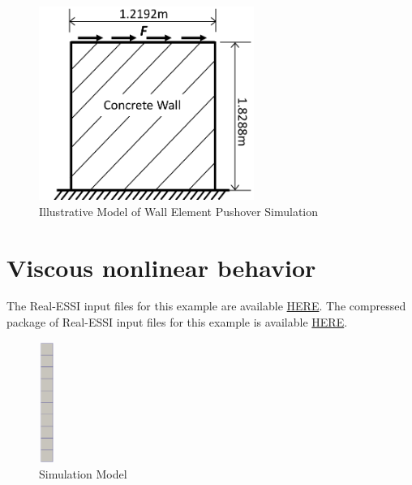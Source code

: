 \begin{figure}[H]
  \centering
  \includegraphics[width = 7cm]{./Figure-files/Day3/Wall_Pushover/overview.pdf}
  \caption{Illustrative Model of Wall Element Pushover Simulation }
  \label{fig_frame_pushover_wall}
\end{figure}


\clearpage
\newpage
\section{ Viscous nonlinear behavior }
\label{Viscous_nonlinear_behavior}

The Real-ESSI input files for this example are available 
\href{http://cml01.engr.ucdavis.edu/shortCourse/Day3/Viscous_nonlinear_behavior/Rayleigh}{HERE}. 
The compressed package of Real-ESSI input files for this example is available 
\href{http://cml01.engr.ucdavis.edu/shortCourse/Day3/Viscous_nonlinear_behavior/Rayleigh/Rayleigh.tgz}{HERE}. 


\begin{figure}[H]
  \centering
  \includegraphics[width = 0.5cm]{./Figure-files/Day3/Viscous_nonlinear_behavior/overview.png}
  \caption{Simulation Model}
  \label{fig_contact_examples1}
\end{figure}

